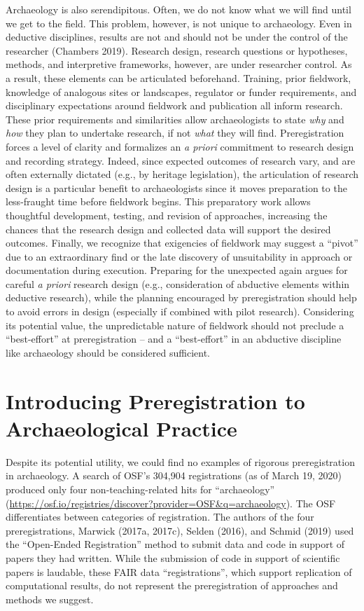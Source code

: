 \documentclass[article]{sa}
\begin{document}
Archaeology is also serendipitous. Often, we do not know what we will
find until we get to the field. This problem, however, is not unique to
archaeology. Even in deductive disciplines, results are not and should
not be under the control of the researcher
(Chambers 2019). Research
design, research questions or hypotheses, methods, and interpretive
frameworks, however, are under researcher control. As a result, these
elements can be articulated beforehand. Training, prior fieldwork,
knowledge of analogous sites or landscapes, regulator or funder
requirements, and disciplinary expectations around fieldwork and
publication all inform research. These prior requirements and
similarities allow archaeologists to state \emph{why} and \emph{how}
they plan to undertake research, if not \emph{what} they will find.
Preregistration forces a level of clarity and formalizes an \emph{a
priori} commitment to research design and recording strategy. Indeed,
since expected outcomes of research vary, and are often externally
dictated (e.g., by heritage legislation), the articulation of research
design is a particular benefit to archaeologists since it moves
preparation to the less-fraught time before fieldwork begins. This
preparatory work allows thoughtful development, testing, and revision of
approaches, increasing the chances that the research design and
collected data will support the desired outcomes. Finally, we recognize
that exigencies of fieldwork may suggest a ``pivot'' due to an
extraordinary find or the late discovery of unsuitability in approach or
documentation during execution. Preparing for the unexpected again
argues for careful \emph{a priori} research design (e.g., consideration
of abductive elements within deductive research), while the planning
encouraged by preregistration should help to avoid errors in design
(especially if combined with pilot research). Considering its potential
value, the unpredictable nature of fieldwork should not preclude a
``best-effort'' at preregistration -- and a ``best-effort'' in an
abductive discipline like archaeology should be considered sufficient.

\section{Introducing Preregistration to
Archaeological Practice}

Despite its potential utility, we could find no examples of rigorous
preregistration in archaeology. A search of OSF's 304,904 registrations
(as of March 19, 2020) produced only four non-teaching-related hits for
``archaeology''
(\href{https://osf.io/registries/discover?provider=OSF\&q=archaeology}{{https://osf.io/registries/discover?provider=OSF\&q=archaeology}}).
The OSF differentiates between categories of registration. The authors
of the four preregistrations, Marwick (2017a, 2017c), Selden (2016), and
Schmid (2019) used the ``Open-Ended Registration'' method to submit data
and code in support of papers they had written. While the submission of
code in support of scientific papers is laudable, these FAIR data
``registrations'', which support replication of computational results, do
not represent the preregistration of approaches and methods we suggest.
\end{document}
